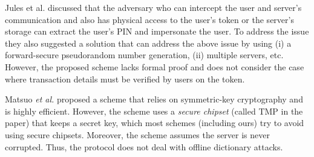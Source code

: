 \begin{enumerate}

Jules et al. \cite{juels2016configurable} discussed that the adversary who can intercept the user and server's communication and also has physical access to the user's token or the server's storage can extract the user's PIN and impersonate the user. To address the issue they also suggested a solution that can address the above issue by using (i) a forward-secure pseudorandom number generation, (ii) multiple servers, etc. However, the proposed scheme lacks formal proof and does not consider the case where transaction details must be verified by users on the token.  


Matsuo \textit{et al.} \cite{MatsuoMY11} proposed a scheme that relies on symmetric-key cryptography and is highly efficient. However, the scheme uses a \emph{secure chipset} (called TMP in the paper) that keeps a secret key, which most schemes (including ours) try to avoid using secure chipsets. Moreover, the scheme assumes the server is never corrupted. Thus, the protocol does not deal with offline dictionary attacks. 





\end{enumerate}
